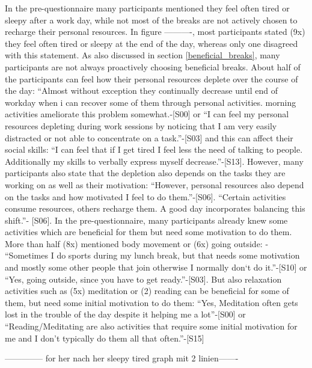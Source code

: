 \documentclass{hasel_thesis}
\begin{document}
In the pre-questionnaire many participants mentioned they feel often tired or sleepy after a work day, while not most of the breaks are not actively chosen to recharge their personal resources. In figure ----------, most participants stated (9x) they feel often tired or sleepy at the end of the day, whereas only one disagreed with this statement. As also discussed in section \ref{beneficial_breaks}, many participants are not always proactively choosing beneficial breaks. About half of the participants can feel how their personal resources deplete over the course of the day: “Almost without exception they continually decrease until end of workday when i can recover some of them through personal activities. morning activities ameliorate this problem somewhat.-[S00] or “I can feel my personal resources depleting during work sessions by noticing that I am very easily distracted or not able to concentrate on a task.”-[S03] and this can affect their social skills: “I can feel that if I get tired I feel less the need of talking to people. Additionally my skills to verbally express myself decrease.”-[S13]. However, many participants also state that the depletion also depends on the tasks they are working on as well as their motivation: “However, personal resources also depend on the tasks and how motivated I feel to do them.”-[S06]. “Certain activities consume resources, others recharge them. A good day incorporates balancing this shift.”- [S06]. In the pre-questionnaire, many participants already knew some activities which are beneficial for them but need some motivation to do them. More than half (8x) mentioned body movement or (6x) going outside: -	“Sometimes I do sports during my lunch break, but that needs some motivation and mostly some other people that join otherwise I normally don‘t do it.”-[S10] or “Yes, going outside, since you have to get ready.”-[S03]. But also relaxation activities such as (5x) meditation or (2) reading can be beneficial for some of them, but need some initial motivation to do them: “Yes, Meditation often gets lost in the trouble of the day despite it helping me a lot”-[S00] or “Reading/Meditating are also activities that require some initial motivation for me and I don't typically do them all that often.”-[S15]

-------------- for her nach her sleepy tired graph mit 2 linien-------
\end{document}
